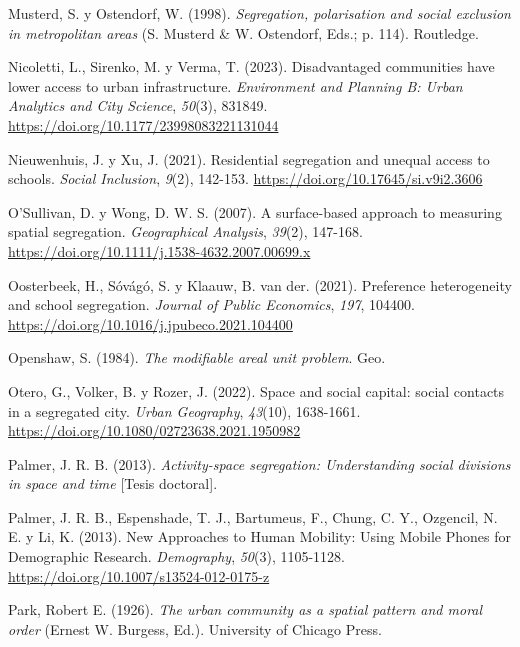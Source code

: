 \documentclass[
  spanish,
  a4paper,%
  chapterprefix=true,%
  DIV=calc,%
  twoside]{scrbook}%
\newlength{\cslhangindent}
\newenvironment{CSLReferences}[2] %
 {\begin{list}{}{%
  \setlength{\itemindent}{0pt}
  \setlength{\leftmargin}{0pt}
  \setlength{\parsep}{0pt}
  \ifodd #1
   \setlength{\leftmargin}{\cslhangindent}
   \setlength{\itemindent}{-1\cslhangindent}
  \fi
  \setlength{\itemsep}{#2\baselineskip}}}
 {\end{list}}
\begin{document}
\begin{CSLReferences}{1}{0}
Musterd, S. y Ostendorf, W. (1998). \emph{Segregation, polarisation and social exclusion in metropolitan areas} (S. Musterd \& W. Ostendorf, Eds.; p. 114). Routledge.

Nicoletti, L., Sirenko, M. y Verma, T. (2023). Disadvantaged communities have lower access to urban infrastructure. \emph{Environment and Planning B: Urban Analytics and City Science}, \emph{50}(3), 831849. \url{https://doi.org/10.1177/23998083221131044}

Nieuwenhuis, J. y Xu, J. (2021). Residential segregation and unequal access to schools. \emph{Social Inclusion}, \emph{9}(2), 142-153. \url{https://doi.org/10.17645/si.v9i2.3606}

O'Sullivan, D. y Wong, D. W. S. (2007). A surface-based approach to measuring spatial segregation. \emph{Geographical Analysis}, \emph{39}(2), 147-168. \url{https://doi.org/10.1111/j.1538-4632.2007.00699.x}

Oosterbeek, H., Sóvágó, S. y Klaauw, B. van der. (2021). Preference heterogeneity and school segregation. \emph{Journal of Public Economics}, \emph{197}, 104400. \url{https://doi.org/10.1016/j.jpubeco.2021.104400}

Openshaw, S. (1984). \emph{The modifiable areal unit problem}. Geo.

Otero, G., Volker, B. y Rozer, J. (2022). Space and social capital: social contacts in a segregated city. \emph{Urban Geography}, \emph{43}(10), 1638-1661. \url{https://doi.org/10.1080/02723638.2021.1950982}

Palmer, J. R. B. (2013). \emph{Activity-space segregation: Understanding social divisions in space and time} {[}Tesis doctoral{]}.

Palmer, J. R. B., Espenshade, T. J., Bartumeus, F., Chung, C. Y., Ozgencil, N. E. y Li, K. (2013). New Approaches to Human Mobility: Using Mobile Phones for Demographic Research. \emph{Demography}, \emph{50}(3), 1105-1128. \url{https://doi.org/10.1007/s13524-012-0175-z}

Park, Robert E. (1926). \emph{The urban community as a spatial pattern and moral order} (Ernest W. Burgess, Ed.). University of Chicago Press.


\end{CSLReferences}
\end{document}
